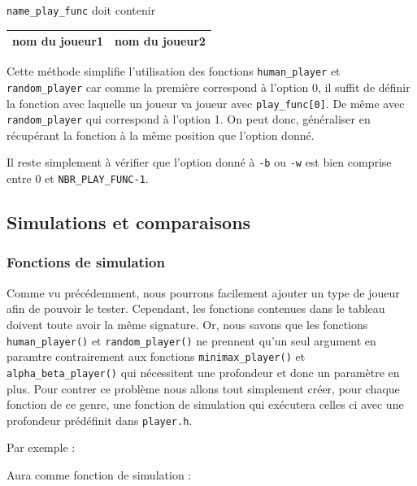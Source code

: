 \documentclass{report}
\begin{document}
\texttt{name\_play\_func} doit contenir
\begin{center}
\renewcommand{\arraystretch} {1.5}
       \begin{tabular}{|c|c|}
        \hline
        nom du joueur1 & nom du joueur2 \\
        \hline
    \end{tabular}
\end{center}


Cette méthode simplifie l'utilisation des fonctions \texttt{human\_player} et \texttt{random\_player} car comme la première correspond à l'option 0, il suffit de définir la fonction avec laquelle un joueur va joueur avec \texttt{play\_func[0]}. De même avec \texttt{random\_player} qui correspond à l'option 1. On peut donc, généraliser en récupérant la fonction à la même position que l'option donné.

Il reste simplement à vérifier que l'option donné à \texttt{-b} ou \texttt{-w} est bien comprise entre 0 et \texttt{NBR\_PLAY\_FUNC-1}.

\subsection{Simulations et comparaisons}

\subsubsection{Fonctions de simulation}

Comme vu précédemment, nous pourrons facilement ajouter un type de joueur afin de pouvoir le tester. Cependant, les fonctions contenues dans le tableau doivent toute avoir la même signature. Or, nous savons que les fonctions \texttt{human\_player()} et \texttt{random\_player()} ne prennent qu'un seul argument en paramtre contrairement aux fonctions \texttt{minimax\_player()} et \texttt{alpha\_beta\_player()} qui nécessitent une profondeur et donc un paramètre en plus. Pour contrer ce problème nous allons tout simplement créer, pour chaque fonction de ce genre, une fonction de simulation qui exécutera celles ci avec une profondeur prédéfinit dans \texttt{player.h}. \newline

Par exemple :
\begin{center}
\end{center}

Aura comme fonction de simulation :
\end{document}
